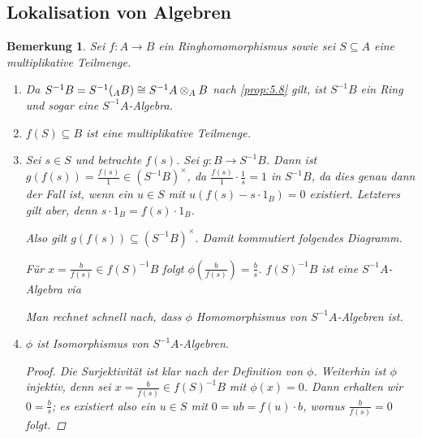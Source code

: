 \documentclass[12pt,a4paper]{scrartcl}
\theoremstyle{cplain}
\theoremstyle{cdef}
\newtheorem{beme}[thmcounter]{Bemerkung}
\begin{document}
\subsection{Lokalisation von Algebren}
\begin{beme}
	Sei $f\colon A\to B$ ein Ringhomomorphismus sowie sei $S\subseteq A$ eine multiplikative Teilmenge.
	\begin{enumerate}
		\item Da $S^{-1}B = S^{-1}({}_AB) \cong S^{-1}A\otimes_A B$ nach \cref{prop:5.8} gilt, ist $S^{-1}B$ ein Ring und sogar eine $S^{-1}A$-Algebra.
		\item $f(S)\subseteq B$ ist eine multiplikative Teilmenge.
		\item Sei $s\in S$ und betrachte $f(s)$. Sei $g\colon B\to S^{-1}B$. Dann ist $g(f(s)) = \frac{f(s)}{1} \in (S^{-1}B)^{\times}$, da $\frac{f(s)}{1} \cdot \frac{1}{s} = 1$
		in $S^{-1}B$, da dies genau dann der Fall ist, wenn ein $u\in S$ mit $u(f(s)-s\cdot 1_B) = 0$ existiert. Letzteres gilt aber, denn $s\cdot 1_B = f(s)\cdot 1_B$.
		
		Also gilt $g(f(s)) \subseteq (S^{-1}B)^{\times}$. Damit kommutiert folgendes Diagramm.
		\begin{center}
		\end{center}
		Für $x = \frac{b}{f(s)}\in f(S)^{-1}B$ folgt $\phi\left(\frac{b}{f(s)}\right) = \frac{b}{s}$.
		$f(S)^{-1}B$ ist eine $S^{-1}A$-Algebra via
		\begin{center}
		\end{center}
		Man rechnet schnell nach, dass $\phi$ Homomorphismus von $S^{-1}A$-Algebren ist.
		\item $\phi$ ist Isomorphismus von $S^{-1}A$-Algebren.
		\begin{proof}
			Die Surjektivität ist klar nach der Definition von $\phi$. Weiterhin ist $\phi$ injektiv, denn sei $x = \frac{b}{f(s)}\in f(S)^{-1}B$ mit $\phi(x) = 0$. Dann erhalten wir $0 = \frac bs$; es existiert also ein $u\in S$ mit $0 = ub = f(u)\cdot b$, woraus $\frac{b}{f(s)} = 0$ folgt.
		\end{proof}
	\end{enumerate}	
\end{beme}
\end{document}
